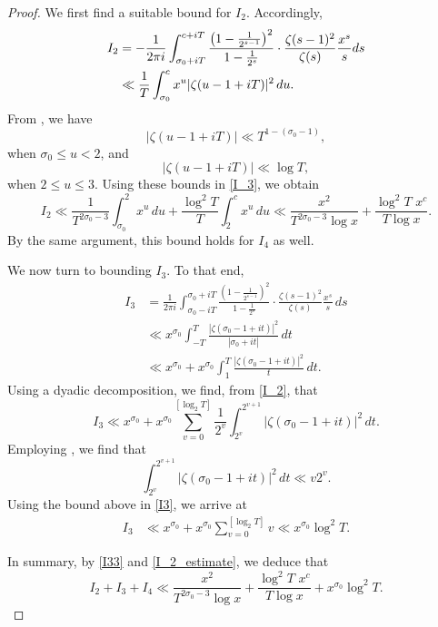 \documentclass[11pt,reqno]{amsart}
\theoremstyle{plain}
\numberwithin{equation}{section}
\begin{document}
\begin{proof}
We first find a suitable bound for $I_2$.  Accordingly,
\begin{align}
    I_2&=-\frac{1}{2\pi i}\int_{\sigma_0+iT}^{c+iT}\frac{\left(1-\frac{1}{2^{s-1}}\right)^2}{1-\frac{1}{2^s}}\cdot \frac{\zeta(s-1)^2}{\zeta(s)}\frac{x^s}{s} ds\notag\\&
    \ll \frac{1}{T}\int_{\sigma_0}^cx^u|\zeta(u-1+iT)|^2\,du.\label{I_3}
\end{align}
From \cite[p.~96, Equation (5.1.4)]{zeta}, we
have
\[|\zeta(u-1+iT)|\ll T^{1-(\sigma_0-1)},\]
when $\sigma_0\leq u<2$, and%
\[|\zeta(u-1+iT)|\ll \log T, \]
 when $2\leq u\leq 3$.
 Using these bounds in \eqref{I_3}, we obtain
\begin{equation}
    I_2\ll  \frac{1}{T^{2\sigma_0-3}} \int_{\sigma_0}^2 x^u \,du+ \frac{\log^2 T}{T}\int_{2}^c x^u \,du\ll  \frac{x^2}{T^{2\sigma_0-3}\log x}+\frac{\log^2 T\,\, x^c}{T\log x}
    \label{I33}.
\end{equation}
By the same argument, this bound holds for $I_4$ as well.

We now turn to bounding $I_3$.  To that end,
 \begin{align}
    I_3&=\frac{1}{2\pi i} \int_{\sigma_0-iT} ^{\sigma_0+iT} \frac{\left(1-\frac{1}{2^{s-1}}\right)^2}{1-\frac{1}{2^s}}\cdot \frac{\zeta(s-1)^2}{\zeta(s)}\frac{x^s}{s}\, ds \nonumber\\
    &\ll x^{\sigma_0}\int_{-T}^{T} \frac{|\zeta(\sigma_0-1+it)|^2}{|\sigma_0+it|}\,dt\nonumber\\
   & \ll x^{\sigma_0}+x^{\sigma_0}\int_1^T\frac{|\zeta(\sigma_0-1+it)|^2}{t}\,dt. \label{I_2}
\end{align}
Using a dyadic decomposition, we find, from \eqref{I_2}, that
\begin{equation}\label{I3}
   I_3 \ll x^{\sigma_0}+x^{\sigma_0}  \sum_{v=0}^{[ \log_2 T]}\frac{1}{2^v} \int _{2^v} ^{2^{v+1} } |\zeta(\sigma_0-1 +it)|^2\, dt.
\end{equation}
Employing  \cite[p.~118, Theorem 7.2(A)]{zeta}, we find that 
\begin{equation*}
    \int_{2^v} ^{2^{v+1}} |\zeta(\sigma_0-1 +it)|^2\,dt \ll v2^v.
\end{equation*}
Using the bound above in \eqref{I3}, we arrive at 
\begin{align}
    I_3&\ll x^{\sigma_0}+x^{\sigma_0} \sum_{v=0} ^{[ \log_2 T ]} v \ll  x^{\sigma_0}\log^2 T. \label{I_2_estimate}
\end{align}


In summary, by  \eqref{I33} and \eqref{I_2_estimate}, we deduce that
\begin{equation}\label{III}
 I_2+I_3+I_4 \ll   \frac{x^2}{T^{2\sigma_0-3}\log x}+\frac{\log^2 T\,\, x^c}{T\log x}+ x^{\sigma_0}\log^2 T.
 \end{equation}


\end{proof}
\end{document}
